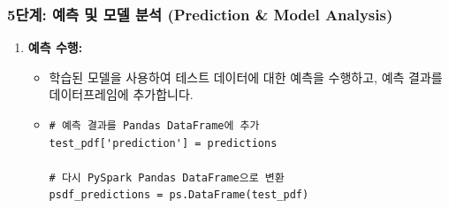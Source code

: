 \documentclass[11pt,a4paper]{article}
\begin{document}
\subsubsection{5단계: 예측 및 모델 분석 (Prediction & Model Analysis)}
\begin{enumerate}
    \item \textbf{예측 수행:}
    \begin{itemize}
        \item 학습된 모델을 사용하여 테스트 데이터에 대한 예측을 수행하고, 예측 결과를 데이터프레임에 추가합니다.
        \item \lstset{language=Python}
        \begin{lstlisting}[caption=예측 수행 코드]
# 예측 결과를 Pandas DataFrame에 추가
test_pdf['prediction'] = predictions

# 다시 PySpark Pandas DataFrame으로 변환
psdf_predictions = ps.DataFrame(test_pdf)


\end{lstlisting}
\end{itemize}
\end{enumerate}
\end{document}
